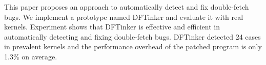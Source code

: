 \documentclass[10pt]{llncs}
\begin{document}
This paper proposes an approach to automatically detect and fix double-fetch bugs. We implement a prototype named DFTinker and evaluate it with real kernels. Experiment shows that DFTinker is effective and efficient in automatically detecting and fixing double-fetch bugs. DFTinker detected 24 cases in prevalent kernels and the performance overhead of the patched program is only 1.3\% on average.








\end{document}
